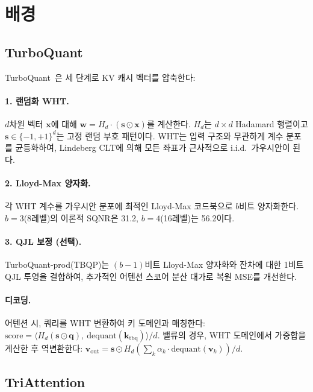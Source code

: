 \documentclass[10pt,twocolumn]{article}
\begin{document}
\section{배경}
\label{sec:background}

\subsection{TurboQuant}

TurboQuant~\cite{turboquant2026}은 세 단계로 KV 캐시 벡터를 압축한다:

\paragraph{1. 랜덤화 WHT.} $d$차원 벡터 $\mathbf{x}$에 대해 $\mathbf{w} = H_d \cdot (\mathbf{s} \odot \mathbf{x})$를 계산한다. $H_d$는 $d \times d$ Hadamard 행렬이고 $\mathbf{s} \in \{-1, +1\}^d$는 고정 랜덤 부호 패턴이다. WHT는 입력 구조와 무관하게 계수 분포를 균등화하여, Lindeberg CLT에 의해 모든 좌표가 근사적으로 i.i.d.\ 가우시안이 된다.

\paragraph{2. Lloyd-Max 양자화.} 각 WHT 계수를 가우시안 분포에 최적인 Lloyd-Max 코드북으로 $b$비트 양자화한다. $b=3$(8레벨)의 이론적 SQNR은 31.2, $b=4$(16레벨)는 56.2이다.

\paragraph{3. QJL 보정 (선택).} TurboQuant-prod(TBQP)는 $(b{-}1)$비트 Lloyd-Max 양자화와 잔차에 대한 1비트 QJL 투영을 결합하여, 추가적인 어텐션 스코어 분산 대가로 복원 MSE를 개선한다.

\paragraph{디코딩.} 어텐션 시, 쿼리를 WHT 변환하여 키 도메인과 매칭한다: $\text{score} = \langle H_d(\mathbf{s} \odot \mathbf{q}),\ \text{dequant}(\mathbf{k}_\text{tbq}) \rangle / d$. 밸류의 경우, WHT 도메인에서 가중합을 계산한 후 역변환한다: $\mathbf{v}_\text{out} = \mathbf{s} \odot H_d(\sum_k \alpha_k \cdot \text{dequant}(\mathbf{v}_k)) / d$.

\subsection{TriAttention}
\end{document}
